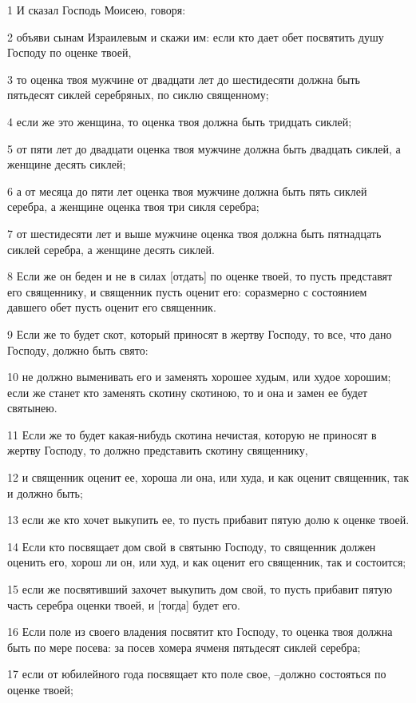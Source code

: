 \par 1 И сказал Господь Моисею, говоря:
\par 2 объяви сынам Израилевым и скажи им: если кто дает обет посвятить душу Господу по оценке твоей,
\par 3 то оценка твоя мужчине от двадцати лет до шестидесяти должна быть пятьдесят сиклей серебряных, по сиклю священному;
\par 4 если же это женщина, то оценка твоя должна быть тридцать сиклей;
\par 5 от пяти лет до двадцати оценка твоя мужчине должна быть двадцать сиклей, а женщине десять сиклей;
\par 6 а от месяца до пяти лет оценка твоя мужчине должна быть пять сиклей серебра, а женщине оценка твоя три сикля серебра;
\par 7 от шестидесяти лет и выше мужчине оценка твоя должна быть пятнадцать сиклей серебра, а женщине десять сиклей.
\par 8 Если же он беден и не в силах [отдать] по оценке твоей, то пусть представят его священнику, и священник пусть оценит его: соразмерно с состоянием давшего обет пусть оценит его священник.
\par 9 Если же то будет скот, который приносят в жертву Господу, то все, что дано Господу, должно быть свято:
\par 10 не должно выменивать его и заменять хорошее худым, или худое хорошим; если же станет кто заменять скотину скотиною, то и она и замен ее будет святынею.
\par 11 Если же то будет какая-нибудь скотина нечистая, которую не приносят в жертву Господу, то должно представить скотину священнику,
\par 12 и священник оценит ее, хороша ли она, или худа, и как оценит священник, так и должно быть;
\par 13 если же кто хочет выкупить ее, то пусть прибавит пятую долю к оценке твоей.
\par 14 Если кто посвящает дом свой в святыню Господу, то священник должен оценить его, хорош ли он, или худ, и как оценит его священник, так и состоится;
\par 15 если же посвятивший захочет выкупить дом свой, то пусть прибавит пятую часть серебра оценки твоей, и [тогда] будет его.
\par 16 Если поле из своего владения посвятит кто Господу, то оценка твоя должна быть по мере посева: за посев хомера ячменя пятьдесят сиклей серебра;
\par 17 если от юбилейного года посвящает кто поле свое, --должно состояться по оценке твоей;
